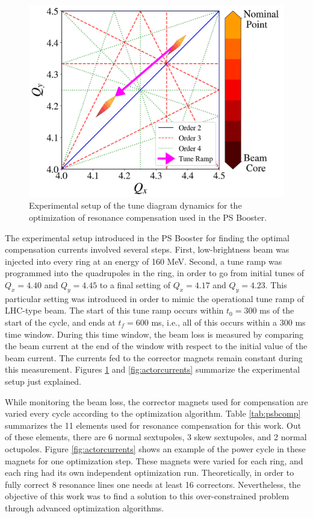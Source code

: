\begin{figure}[H]
    \centering
    \includegraphics[width=\linewidth]{chapter5/experiment.png}
    \caption{Experimental setup of the tune diagram dynamics for the optimization of resonance compensation used in the PS Booster.}
    \label{fig:experimentPSB}
\end{figure}

The experimental setup introduced in the PS Booster for finding the optimal compensation currents involved several steps. First, low-brightness beam was injected into every ring at an energy of 160 MeV. Second, a tune ramp was programmed into the quadrupoles in the ring, in order to go from initial tunes of $Q_x = 4.40$ and $Q_y = 4.45$ to a final setting of $Q_x = 4.17$ and $Q_y = 4.23$. This particular setting was introduced in order to mimic the operational tune ramp of LHC-type beam. The start of this tune ramp occurs within $t_0 = 300$ ms of the start of the cycle, and ends at $t_f = 600$ ms, i.e., all of this occurs within a 300 ms time window. During this time window, the beam loss is measured by comparing the beam current at the end of the window with respect to the initial value of the beam current. The currents fed to the corrector magnets remain constant during this measurement. Figures \ref{fig:experimentPSB} and \ref{fig:actorcurrents} summarize the experimental setup just explained. 

While monitoring the beam loss, the corrector magnets used for compensation are varied every cycle according to the optimization algorithm. Table \ref{tab:psbcomp} summarizes the 11 elements used for resonance compensation for this work. Out of these elements, there are 6 normal sextupoles, 3 skew sextupoles, and 2 normal octupoles. Figure \ref{fig:actorcurrents} shows an example of the power cycle in these magnets for one optimization step. These magnets were varied for each ring, and each ring had its own independent optimization run. Theoretically, in order to fully correct 8 resonance lines one needs at least 16 correctors. Nevertheless, the objective of this work was to find a solution to this over-constrained problem through advanced optimization algorithms. 

